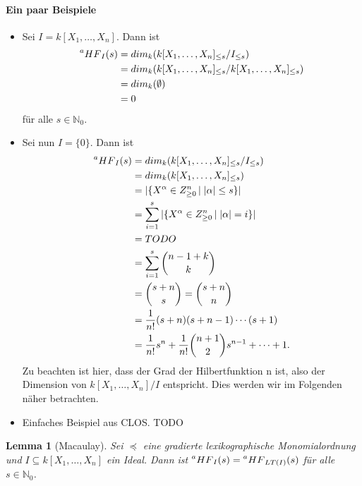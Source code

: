 \documentclass{article}
\newtheorem{lemma}[satz]{Lemma}
\newcommand*{\R}{k[X_{1},\ldots,X_{n}]}
\begin{document}
	\paragraph{Ein paar Beispiele}
	\begin{itemize}
	\item Sei \(I = \R\). Dann ist
		\begin{align*}
			\prescript{a}{}{HF}_{I}(s) &= dim_{k}(\R_{\leq s}/I_{\leq s}) \\
			&= dim_{k}(\R_{\leq s}/\R_{\leq s}) \\
			&= dim_{k}(\emptyset) \\
			&= 0
		\end{align*}
	 für alle \(s \in \mathbb{N}_{0}\).  
	\item Sei nun \(I = \{0\}\). Dann ist
		\begin{align*}
			\prescript{a}{}{HF}_{I}(s) &= dim_{k}(\R_{\leq s}/I_{\leq s}) \\
			&= dim_{k}(\R_{\leq s}) \\
			&= |\{ X^{\alpha} \in Z^{n}_{\geq 0}\, |\; |\alpha| \leq s\}| \\
			&= \sum_{i=1}^{s} |\{ X^{\alpha} \in Z^{n}_{\geq 0}\, |\; |\alpha| = i\}| \\
			&= TODO \\
			&= \sum_{i=1}^{s} \binom{n-1+k}{k} \\
			&= \binom{s+n}{s} = \binom{s+n}{n} \\
			&= \frac{1}{n!}(s+n)(s+n-1)\cdots (s+1) \\
			&= \frac{1}{n!}s^{n} + \frac{1}{n!}\binom{n+1}{2}s^{n-1} + \cdots + 1. \\
		\end{align*}
	Zu beachten ist hier, dass der Grad der Hilbertfunktion n ist, also der Dimension von \(\R/I\)
	entspricht. Dies werden wir im Folgenden näher betrachten.
	\item Einfaches Beispiel aus CLOS. TODO
	\end{itemize}
	

	\begin{lemma}[Macaulay] \label{1.2.13}
	Sei \(\preceq\) eine gradierte lexikographische Monomialordnung und \(I \subseteq \R\) ein
	Ideal. Dann ist \(\prescript{a}{}{HF}_{I}(s) = \prescript{a}{}{HF}_{LT(I)}(s)\) für alle
	\(s \in \mathbb{N}_{0}\).
	\end{lemma}
\end{document}
